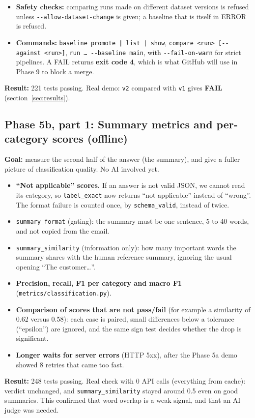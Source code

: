 \documentclass[11pt,a4paper]{article}
\newcommand{\code}[1]{\nolinkurl{#1}}
\begin{document}
\begin{itemize}
        with machine-readable \emph{reasons} (for example \code{critical_regression},
        \code{schema_valid_floor}), plus information notes such as \code{statistical_power}:
        ``with 12 cases, one case is 8.3 points; at least 4 one-way regressions are needed for
        significance''.
  \item \textbf{Safety checks:} comparing runs made on different dataset versions is refused
        unless \texttt{-{}-allow-dataset-change} is given; a baseline that is itself in ERROR
        is refused.
  \item \textbf{Commands:} \texttt{baseline promote | list | show}, \texttt{compare <run>
        [-{}-against <run>]}, \texttt{run \ldots\ -{}-baseline main}, with
        \texttt{-{}-fail-on-warn} for strict pipelines. A FAIL returns \textbf{exit code 4},
        which is what GitHub will use in Phase 9 to block a merge.
\end{itemize}
\textbf{Result:} 221 tests passing. Real demo: \code{v2} compared with \code{v1} gives
\textbf{FAIL} (section~\ref{sec:results}).

\subsection{Phase 5b, part 1: Summary metrics and per-category scores (offline)}
\textbf{Goal:} measure the second half of the answer (the summary), and give a fuller picture
of classification quality. No AI involved yet.
\begin{itemize}
  \item \textbf{``Not applicable'' scores.} If an answer is not valid JSON, we cannot read its
        category, so \code{label_exact} now returns ``not applicable'' instead of ``wrong''.
        The format failure is counted once, by \code{schema_valid}, instead of twice.
  \item \code{summary_format} (gating): the summary must be one sentence, 5 to 40 words, and
        not copied from the email.
  \item \code{summary_similarity} (information only): how many important words the summary
        shares with the human reference summary, ignoring the usual opening ``The customer\ldots''.
  \item \textbf{Precision, recall, F1 per category and macro F1} (\code{metrics/classification.py}).
  \item \textbf{Comparison of scores that are not pass/fail} (for example a similarity of 0.62
        versus 0.58): each case is paired, small differences below a tolerance (``epsilon'')
        are ignored, and the same sign test decides whether the drop is significant.
  \item \textbf{Longer waits for server errors} (HTTP 5xx), after the Phase 5a demo showed 8
        retries that came too fast.
\end{itemize}
\textbf{Result:} 248 tests passing. Real check with 0 API calls (everything from cache):
verdict unchanged, and \code{summary_similarity} stayed around 0.5 even on good summaries.
This confirmed that word overlap is a weak signal, and that an AI judge was needed.
\end{document}
